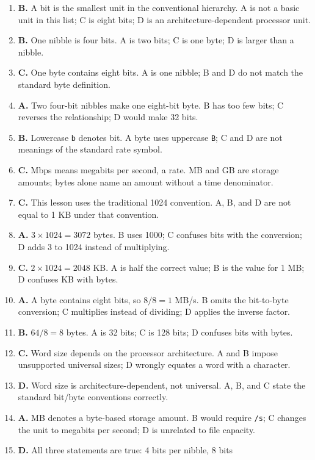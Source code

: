\begin{enumerate}[label=\textbf{Q\arabic*.}, leftmargin=*]
\item \textbf{B.} A bit is the smallest unit in the conventional hierarchy.
  A is not a basic unit in this list; C is eight bits; D is an
  architecture-dependent processor unit.
\item \textbf{B.} One nibble is four bits. A is two bits; C is one byte; D is
  larger than a nibble.
\item \textbf{C.} One byte contains eight bits. A is one nibble; B and D do
  not match the standard byte definition.
\item \textbf{A.} Two four-bit nibbles make one eight-bit byte. B has too
  few bits; C reverses the relationship; D would make 32 bits.
\item \textbf{B.} Lowercase \texttt{b} denotes bit. A byte uses uppercase
  \texttt{B}; C and D are not meanings of the standard rate symbol.
\item \textbf{C.} Mbps means megabits per second, a rate. MB and GB are
  storage amounts; bytes alone name an amount without a time denominator.
\item \textbf{C.} This lesson uses the traditional 1024 convention. A, B,
  and D are not equal to 1 KB under that convention.
\item \textbf{A.} $3\times1024=3072$ bytes. B uses 1000; C confuses bits
  with the conversion; D adds 3 to 1024 instead of multiplying.
\item \textbf{C.} $2\times1024=2048$ KB. A is half the correct value; B is
  the value for 1 MB; D confuses KB with bytes.
\item \textbf{A.} A byte contains eight bits, so $8/8=1$ MB/s. B omits the
  bit-to-byte conversion; C multiplies instead of dividing; D applies the
  inverse factor.
\item \textbf{B.} $64/8=8$ bytes. A is 32 bits; C is 128 bits; D confuses
  bits with bytes.
\item \textbf{C.} Word size depends on the processor architecture. A and B
  impose unsupported universal sizes; D wrongly equates a word with a
  character.
\item \textbf{D.} Word size is architecture-dependent, not universal. A, B,
  and C state the standard bit/byte conventions correctly.
\item \textbf{A.} MB denotes a byte-based storage amount. B would require
  \texttt{/s}; C changes the unit to megabits per second; D is unrelated to
  file capacity.
\item \textbf{D.} All three statements are true: 4 bits per nibble, 8 bits

\end{enumerate}
